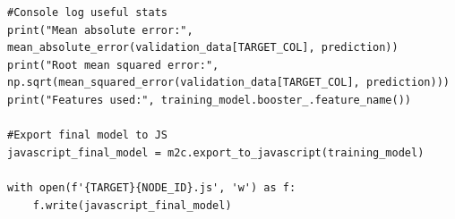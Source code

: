 \begin{multicols}{2}
\begin{lstlisting}
#Console log useful stats
print("Mean absolute error:", mean_absolute_error(validation_data[TARGET_COL], prediction))
print("Root mean squared error:", np.sqrt(mean_squared_error(validation_data[TARGET_COL], prediction)))
print("Features used:", training_model.booster_.feature_name())

#Export final model to JS
javascript_final_model = m2c.export_to_javascript(training_model)

with open(f'{TARGET}{NODE_ID}.js', 'w') as f:
    f.write(javascript_final_model)

    \end{lstlisting}
\end{multicols}
